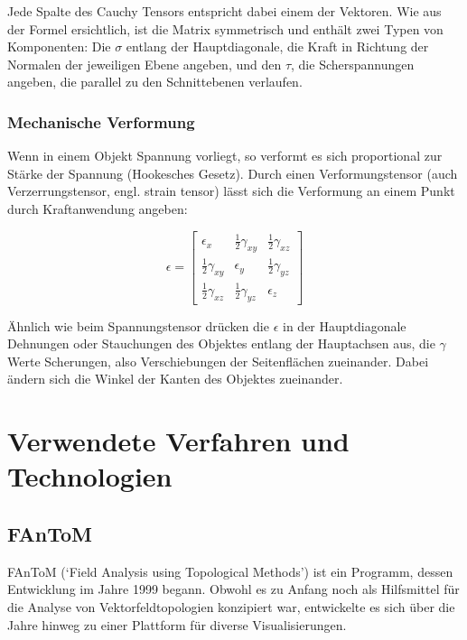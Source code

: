 \documentclass[a4paper,fontsize=12pt,toc=bib,halfparskip]{scrartcl}
\begin{document}
Jede Spalte des Cauchy Tensors entspricht dabei einem der Vektoren. Wie aus der Formel ersichtlich, ist die Matrix symmetrisch und enth\"alt zwei Typen von Komponenten: Die $\sigma$ entlang der Hauptdiagonale, die Kraft in Richtung der Normalen der jeweiligen Ebene angeben, und den $\tau$, die Scherspannungen angeben, die parallel zu den Schnittebenen verlaufen. 

\subsubsection{Mechanische Verformung}
Wenn in einem Objekt Spannung vorliegt, so verformt es sich proportional zur St\"arke der Spannung (Hookesches Gesetz). Durch einen Verformungstensor (auch Verzerrungstensor, engl. strain tensor) l\"asst sich die Verformung an einem Punkt durch Kraftanwendung angeben:

\begin{equation}
	\epsilon  =  
	\begin{bmatrix}
		\epsilon_x & \frac{1}{2}\gamma_{xy} & \frac{1}{2}\gamma_{xz}\\
		\frac{1}{2}\gamma_{xy} & \epsilon_y & \frac{1}{2}\gamma_{yz}\\
		\frac{1}{2}\gamma_{xz} & \frac{1}{2}\gamma_{yz} & \epsilon_z
	\end{bmatrix}
\end{equation}

\"Ahnlich wie beim Spannungstensor dr\"ucken die $\epsilon$ in der Hauptdiagonale Dehnungen oder Stauchungen des Objektes entlang der Hauptachsen aus, die $\gamma$ Werte Scherungen, also Verschiebungen der Seitenfl\"achen zueinander. Dabei \"andern sich die Winkel der Kanten des Objektes zueinander.

\section{Verwendete Verfahren und Technologien}
\label{sec:Technologien}
\subsection{FAnToM}
FAnToM\cite{fantomWebsite}\cite{wiebel2009fantom} (`Field Analysis using Topological Methods') ist ein Programm, dessen Entwicklung im Jahre 1999 begann. Obwohl es zu Anfang noch als Hilfsmittel f\"ur die Analyse von Vektorfeldtopologien konzipiert war, entwickelte es sich \"uber die Jahre hinweg zu einer Plattform f\"ur diverse Visualisierungen.
\end{document}
